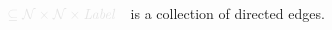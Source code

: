 \documentclass{article}
\newcommand{\notation}[2][]{#1}
\renewcommand{\notation}[2][]{{\color{notationcolor} #2}}
\newcommand{\N}{\mathcal N}
\newcommand{\Ed}{\mathcal E}
\newcommand{\MN}{PDG}
\numberwithin{equation}{section}
\begin{document}
\begin{defn}[\MN]
\begin{description}[nosep]
			\item[$\Ed$] $\notation{\subseteq \N \times \N \times \mathit{Label}}$~~is a collection of directed edges.

\end{description}
\end{defn}
\end{document}
